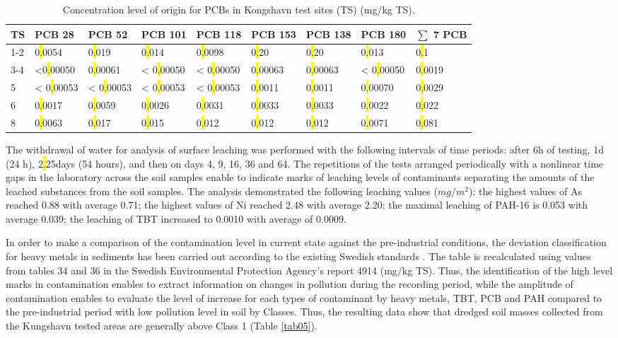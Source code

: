 \documentclass[algorithms,article,submit,pdftex,moreauthors]{Definitions/mdpi}
\begin{document}
\begin{table}[H] 
\caption{Concentration level of origin for PCBs in Kongshavn test sites (TS) (mg/kg TS).\label{tab04}}
\begin{tabularx}{\linewidth}{p{0.5cm}p{1.3cm}p{1.3cm}p{1.3cm}p{1.3cm}p{1.2cm}p{1.2cm}p{1.3cm}p{1.3cm}}
\toprule
\textbf{TS} & \textbf{PCB 28} & \textbf{PCB 52} & \textbf{PCB 101} & \textbf{PCB 118} & \textbf{PCB 153} & \textbf{PCB 138} & \textbf{PCB 180} & \textbf{$\sum$ 7 PCB}\\
\midrule
1-2 & 0\hl{.}0054   & 0\hl{.}019     & 0\hl{.}014 	     & 0\hl{.}0098  & 0\hl{.}20     & 0\hl{.}20       & 0\hl{.}013     & 0\hl{.}1 \\
3-4 & <0\hl{.}00050 & 0\hl{.}00061 & < 0\hl{.}00050    & < 0\hl{.}00050 & 0\hl{.}00063 & 0\hl{.}00063 & < 0\hl{.}00050 & 0\hl{.}0019 \\
5 & < 0\hl{.}00053 & < 0\hl{.}00053  & < 0\hl{.}00053  & < 0\hl{.}00053 & 0\hl{.}0011   & 0\hl{.}0011     & 0\hl{.}00070     & 0\hl{.}0029 \\
6 & 0\hl{.}0017   & 0\hl{.}0059 	& 0\hl{.}0026       & 0\hl{.}0031  & 0\hl{.}0033  & 0\hl{.}0033      & 0\hl{.}0022      & 0\hl{.}022 \\
8 & 0\hl{.}0063   & 0\hl{.}017 	& 0\hl{.}015         & 0\hl{.}012     & 0\hl{.}012    & 0\hl{.}012      & 0\hl{.}0071      & 0\hl{.}081\\
\bottomrule
\end{tabularx}
\end{table}

The withdrawal of water for analysis of surface leaching was performed with the following intervals of time periods: after 6h of testing, 1d (24 h), 2\hl{.}25days (54 hours), and then on days 4, 9, 16, 36 and 64. The repetitions of the tests arranged periodically with a nonlinear time gaps in the laboratory across the soil samples enable to indicate marks of leaching levels of contaminants separating the amounts of the leached substances from the soil samples. The analysis demonstrated the following leaching values ($mg/m^2$): the highest values of As reached 0.88 with average 0.71; the highest values of Ni reached 2.48 with average 2.20; the maximal leaching of PAH-16 is 0.053 with average 0.039; the leaching of TBT increased to 0.0010 with average of 0.0009. 

In order to make a comparison of the contamination level in current state against the pre-industrial conditions, the deviation classification for heavy metals in sediments has been carried out according to the existing Swedish standards \cite{ZefferSamuelsson}. The table is recalculated using values from tables 34 and 36 in the Swedish Environmental Protection Agency's report 4914 (mg/kg TS). Thus, the identification of the high level marks in contamination enables to extract information on changes in pollution during the recording period, while the amplitude of contamination enables to evaluate the level of increase for each types of contaminant by heavy metals, TBT, PCB and PAH compared to the pre-industrial period with low pollution level in soil by Classes. Thus, the resulting data show that dredged soil masses collected from the Kungshavn tested areas are generally above Class 1 (Table \ref{tab05}). 
\end{document}
